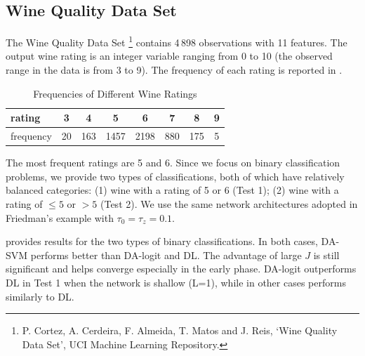 \documentclass[ba]{imsart}
\numberwithin{equation}{section}
\theoremstyle{plain}
\begin{document}
\subsection{Wine Quality Data Set}
The Wine Quality Data Set \footnote{P. Cortez, A. Cerdeira, F. Almeida, T. Matos and J. Reis, `Wine Quality Data Set', UCI Machine Learning Repository.} contains 4\,898 observations with 11 features. The output  wine rating  is an integer variable ranging from 0 to 10 (the observed range in the data is from 3 to 9). The frequency of each rating is reported in .
\begin{table}[!ht]
\centering
\begin{tabular}{l | c c c c c c c }
\toprule
rating & 3 &   4 &   5 &   6 &   7 &   8 &   9  \\
\midrule
frequency & 20 & 163 & 1457 & 2198 & 880 & 175 &   5\\
\bottomrule
\end{tabular}
\caption{Frequencies of Different Wine Ratings}\label{tab:wine}
\vspace{-0.1in}
\end{table}

The most frequent ratings are 5 and 6. Since we focus on binary classification problems, we provide two types of classifications, both of which have relatively balanced categories: (1) wine with a rating of 5 or 6 (Test 1);  (2) wine with a rating of $\leq 5$ or $>5$ (Test 2). We use the same network architectures adopted in Friedman's example with $\tau_0=\tau_z=0.1$.

  provides results for the two types of binary classifications. In both cases, DA-SVM performs better than DA-logit and DL.  The advantage of large $J$ is still significant and helps converge especially in the early phase. DA-logit outperforms DL in Test 1 when the network is shallow (L=1), while in other cases performs similarly to DL. 
\end{document}
